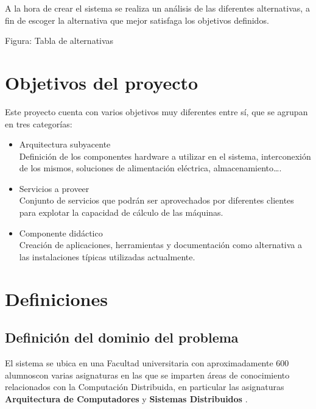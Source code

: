 A la hora de crear el sistema se realiza un análisis de las diferentes alternativas, a fin de escoger la alternativa que mejor satisfaga los objetivos definidos.

Figura: Tabla de alternativas

\section{Objetivos del proyecto}

Este proyecto cuenta con varios objetivos muy diferentes entre sí, que se agrupan en tres categorías:
\begin{itemize}
  \item Arquitectura subyacente\\
  Definición de los componentes hardware a utilizar en el sistema, interconexión de los mismos, soluciones de alimentación eléctrica, almacenamiento\dots.
  \item Servicios a proveer\\
  Conjunto de servicios que podrán ser aprovechados por diferentes clientes para explotar la capacidad de cálculo de las máquinas.
  \item Componente didáctico\\
  Creación de aplicaciones, herramientas y documentación como alternativa a las instalaciones típicas utilizadas actualmente.
\end{itemize}

\section{Definiciones}

\subsection{Definición del dominio del problema}

El sistema se ubica en una Facultad universitaria con aproximadamente 600 alumnos\citationneeded con varias asignaturas en las que se imparten áreas de conocimiento relacionados con la Computación Distribuida, en particular las asignaturas \textbf{Arquitectura de Computadores} y \textbf{Sistemas Distribuidos} \cite{DIA15GuiaAcademica}.

